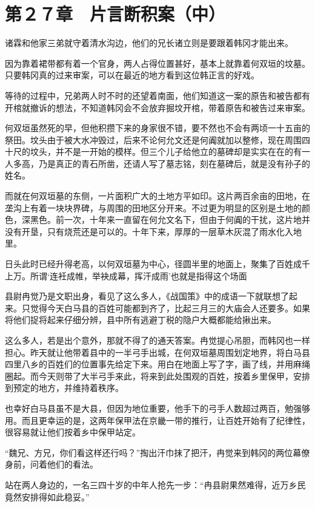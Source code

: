\section{第２７章　片言断积案（中）}

诸霖和他家三弟就守着清水沟边，他们的兄长诸立则是要跟着韩冈才能出来。

因为靠着裙带都有着一个官身，两人占得位置甚好，基本上就靠着何双垣的坟墓。只要韩冈真的过来审案，可以在最近的地方看到这位韩正言的好戏。

等待的过程中，兄弟两人时不时的还望着南面，他们知道这一案的原告和被告都有开棺就撤诉的想法，不知道韩冈会不会放弃掘坟开棺，带着原告和被告过来审案。

何双垣虽然死的早，但他积攒下来的身家很不错，要不然也不会有两顷一十五亩的祭田。坟头由于被大水冲毁过，后来不论何允文还是何阗就加以整修，现在周围四十尺的坟头，并不是一开始的模样。但三个儿子给他立的墓碑却是实实在在的有一人多高，乃是真正的青石所凿，还请人写了墓志铭，刻在墓碑后，就是没有孙子的姓名。

而就在何双垣墓的东侧，一片面积广大的土地方平如印。这片两百余亩的田地，在垄沟上有着一块块界碑，与周围的田地区分开来。不过更为明显的区别是土地的颜色，深黑色。前一次，十年来一直留在何允文名下，但由于何阗的干扰，这片地并没有开垦，只有烧荒还是可以的。十年下来，厚厚的一层草木灰混了雨水化入地里。

日头此时已经升得老高，以何双垣墓为中心，径圆半里的地面上，聚集了百姓成千上万。所谓‘连衽成帷，举袂成幕，挥汗成雨’也就是指得这个场面

县尉冉觉乃是文职出身，看见了这么多人，《战国策》中的成语一下就联想了起来。只觉得今天白马县的百姓可能都到齐了，比起三月三的大庙会人还要多。如果将他们捉将起来仔细分辨，县中所有逃避丁税的隐户大概都能给揪出来。

这么多人，若是出个意外，那就不得了的通天答案。冉觉提心吊胆，而韩冈也一样担心。昨天就让他带着县中的一半弓手出城，在何双垣墓周围划定地界，将白马县四里八乡的百姓们的位置事先给定下来。用白在地面上写了字，画了线，并用麻绳圈起。而今天则带了大半弓手来此，将来到此处围观的百姓，按着乡里保甲，安排到预定的地方，并维持着秩序。

也幸好白马县虽不是大县，但因为地位重要，他手下的弓手人数超过两百，勉强够用。而且更幸运的是，这两年保甲法在京畿一带的推行，让百姓开始有了纪律性，很容易就让他们按着乡中保甲站定。

“魏兄、方兄，你们看这样还行吗？”掏出汗巾抹了把汗，冉觉来到韩冈的两位幕僚身前，问着他们的看法。

站在两人身边的，一名三四十岁的中年人抢先一步：“冉县尉果然难得，近万乡民竟然安排得如此稳妥。”

